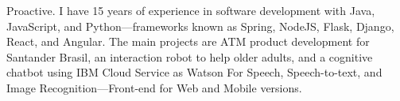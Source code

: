 

\begin{cvparagraph}

Proactive. I have 15 years of experience in software development with Java, JavaScript, and Python—frameworks known as Spring, NodeJS, Flask, Django, React, and Angular. The main projects are ATM product development for Santander Brasil, an interaction robot to help older adults, and a cognitive chatbot using IBM Cloud Service as Watson For Speech, Speech-to-text, and Image Recognition—Front-end for Web and Mobile versions.
\end{cvparagraph}
